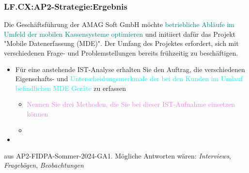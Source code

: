\begin{frame}  
  \frametitle{LF.CX:AP2-Strategie:Ergebnis}

  \begin{footnotesize}
  Die Geschäftsführung der AMAG Soft GmbH möchte \textcolor{teal}{betriebliche Abläufe im Umfeld der mobilen Kassensysteme optimieren} und initiiert dafür das Projekt "Mobile Datenerfassung (MDE)". Der Umfang des Projektes erfordert, sich mit verschiedenen Frage- und Problemstellungen bereits frühzeitig zu beschäftigen.

  \begin{itemize}
    \item[a] Für eine anstehende IST-Analyse erhalten Sie den Auftrag, die verschiedenen Eigenschafts- und \textcolor{cyan}{Unterscheidungsmerkmale der bei den Kunden im Umlauf befindlichen MDE Geräte} zu erfassen
    \begin{itemize}
      \item[aa] \textcolor{violet}{Nennen Sie drei Methoden, die Sie bei dieser IST-Aufnahme einsetzen können}
      \item[...]
    \end{itemize}
    \item[...]
  \end{itemize}
  
  \end{footnotesize}

  
  \vspace{0.5cm}
  \begin{tiny}
  \begin{flushright}
    aus AP2-FIDPA-Sommer-2024-GA1. Mögliche Antworten wären: \textit{Interviews}, \textit{Fragebögen}, \textit{Beobachtungen}
  \end{flushright}
  \end{tiny}

\end{frame}